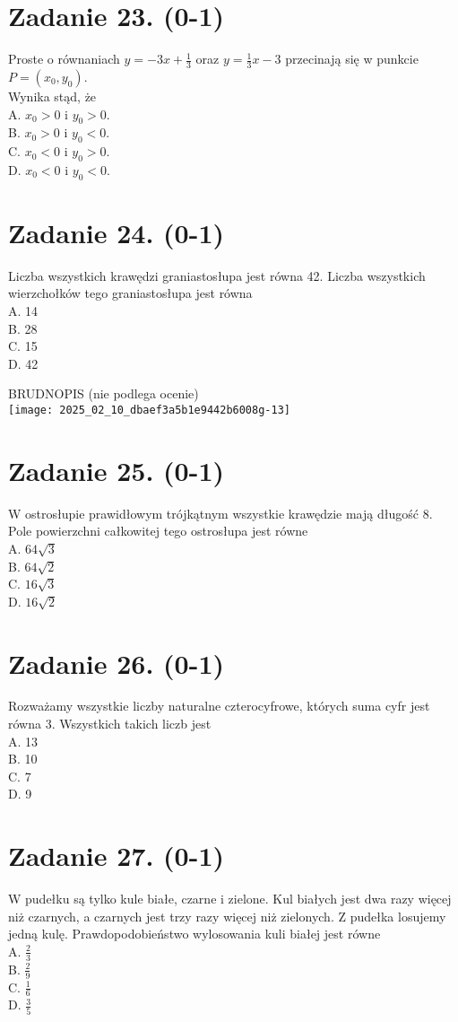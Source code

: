 \documentclass[10pt]{article}
\begin{document}
\section*{Zadanie 23. (0-1)}
Proste o równaniach \(y=-3 x+\frac{1}{3}\) oraz \(y=\frac{1}{3} x-3\) przecinają się w punkcie \(P=\left(x_{0}, y_{0}\right)\).\\
Wynika stąd, że\\
A. \(x_{0}>0\) i \(y_{0}>0\).\\
B. \(x_{0}>0\) i \(y_{0}<0\).\\
C. \(x_{0}<0\) i \(y_{0}>0\).\\
D. \(x_{0}<0\) i \(y_{0}<0\).

\section*{Zadanie 24. (0-1)}
Liczba wszystkich krawędzi graniastosłupa jest równa 42. Liczba wszystkich wierzchołków tego graniastosłupa jest równa\\
A. 14\\
B. 28\\
C. 15\\
D. 42

BRUDNOPIS (nie podlega ocenie)\\
\texttt{[image: 2025\_02\_10\_dbaef3a5b1e9442b6008g-13]}

\section*{Zadanie 25. (0-1)}
W ostrosłupie prawidłowym trójkątnym wszystkie krawędzie mają długość 8. Pole powierzchni całkowitej tego ostrosłupa jest równe\\
A. \(64 \sqrt{3}\)\\
B. \(64 \sqrt{2}\)\\
C. \(16 \sqrt{3}\)\\
D. \(16 \sqrt{2}\)

\section*{Zadanie 26. (0-1)}
Rozważamy wszystkie liczby naturalne czterocyfrowe, których suma cyfr jest równa 3. Wszystkich takich liczb jest\\
A. 13\\
B. 10\\
C. 7\\
D. 9

\section*{Zadanie 27. (0-1)}
W pudełku są tylko kule białe, czarne i zielone. Kul białych jest dwa razy więcej niż czarnych, a czarnych jest trzy razy więcej niż zielonych. Z pudełka losujemy jedną kulę. Prawdopodobieństwo wylosowania kuli białej jest równe\\
A. \(\frac{2}{3}\)\\
B. \(\frac{2}{9}\)\\
C. \(\frac{1}{6}\)\\
D. \(\frac{3}{5}\)
\end{document}
